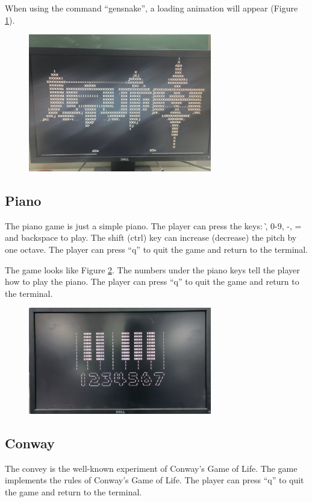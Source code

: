 \documentclass[
	a4paper, %
	11pt, %
]{CSUniSchoolLabReport}
\begin{document}
When using the command ``gensnake'', a loading animation will appear (Figure \ref{fig:image11}).
\begin{figure}[!htb]
    \centering
    \includegraphics[width=8cm]{image11.png}
    \label{fig:image11}
\end{figure}


\subsection{Piano}
The piano game is just a simple piano. The player can press the keys: \`, 0-9, -, = and backspace to play. The shift (ctrl) key can increase (decrease) the pitch by one octave. The player can press ``q'' to quit the game and return to the terminal.

The game looks like Figure \ref{fig:image6}. The numbers under the piano keys tell the player how to play the piano. The player can press ``q'' to quit the game and return to the terminal.

\begin{figure}[!htb]
    \centering
    \includegraphics[width=8cm]{image6.png}
    \label{fig:image6}
\end{figure}

\subsection{Conway}
The convey is the well-known experiment of Conway's Game of Life. The game implements the rules of Conway's Game of Life. The player can press ``q'' to quit the game and return to the terminal.
\end{document}
